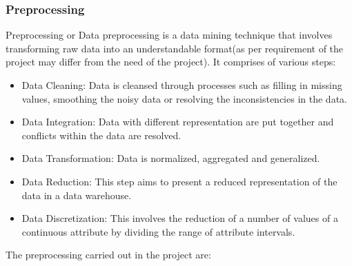 \subsubsection{Preprocessing}
Preprocessing or Data preprocessing is a data mining technique that involves transforming raw data into an understandable format(as per requirement of the project may differ from the need of the project).
It comprises of various steps:
\begin{itemize}
\item Data Cleaning: Data is cleansed through processes such as filling in missing values, smoothing the noisy data or resolving the inconsistencies in the data.
\item Data Integration: Data with different representation are put together and conflicts within the data are resolved.
\item Data Transformation: Data is normalized, aggregated and generalized.
\item Data Reduction: This step aims to present a reduced representation of the data in a data warehouse.
\item Data Discretization: This involves the reduction of a number of values of a continuous attribute by dividing the range of attribute intervals. \\
\end{itemize}
The preprocessing carried out in the project are:
